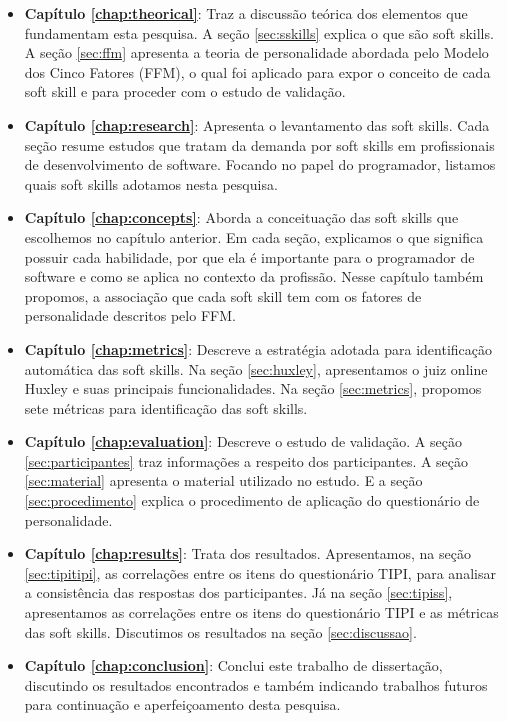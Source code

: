 \begin{itemize}

	\item \textbf{Capítulo \ref{chap:theorical}}: Traz a discussão teórica dos elementos que fundamentam esta pesquisa. A seção \ref{sec:sskills} explica o que são soft skills. A seção \ref{sec:ffm} apresenta a teoria de personalidade abordada pelo Modelo dos Cinco Fatores (FFM), o qual foi aplicado para expor o conceito de cada soft skill e para proceder com o estudo de validação.

	\item \textbf{Capítulo \ref{chap:research}}: Apresenta o levantamento das soft skills. Cada seção resume estudos que tratam da demanda por soft skills em profissionais de desenvolvimento de software. Focando no papel do programador, listamos quais soft skills adotamos nesta pesquisa.

	\item \textbf{Capítulo \ref{chap:concepts}}: Aborda a conceituação das soft skills que escolhemos no capítulo anterior. Em cada seção, explicamos o que significa possuir cada habilidade, por que ela é importante para o programador de software e como se aplica no contexto da profissão. Nesse capítulo também propomos, a associação que cada soft skill tem com os fatores de personalidade descritos pelo FFM.

	\item \textbf{Capítulo \ref{chap:metrics}}: Descreve a estratégia adotada para identificação automática das soft skills. Na seção \ref{sec:huxley}, apresentamos o juiz online Huxley e suas principais funcionalidades. Na seção \ref{sec:metrics}, propomos sete métricas para identificação das soft skills. 

	\item \textbf{Capítulo \ref{chap:evaluation}}: Descreve o estudo de validação. A seção \ref{sec:participantes} traz informações a respeito dos participantes. A seção \ref{sec:material} apresenta o material utilizado no estudo. E a seção \ref{sec:procedimento} explica o procedimento de aplicação do questionário de personalidade.

	\item \textbf{Capítulo \ref{chap:results}}: Trata dos resultados. Apresentamos, na seção \ref{sec:tipitipi}, as correlações entre os itens do questionário TIPI, para analisar a consistência das respostas dos participantes. Já na seção \ref{sec:tipiss}, apresentamos as correlações entre os itens do questionário TIPI e as métricas das soft skills. Discutimos os resultados na seção \ref{sec:discussao}.

	\item \textbf{Capítulo \ref{chap:conclusion}}: Conclui este trabalho de dissertação, discutindo os resultados encontrados e também indicando trabalhos futuros para continuação e aperfeiçoamento desta pesquisa.
	
\end{itemize}

